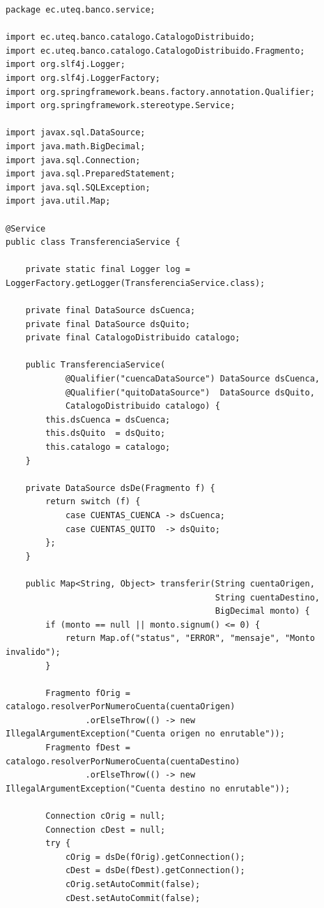 \documentclass[11pt,a4paper]{article}
\begin{document}
\begin{lstlisting}[style=JavaStyle,caption={TransferenciaService.java: simulacion didactica de 2PC en capa de aplicacion}]
package ec.uteq.banco.service;

import ec.uteq.banco.catalogo.CatalogoDistribuido;
import ec.uteq.banco.catalogo.CatalogoDistribuido.Fragmento;
import org.slf4j.Logger;
import org.slf4j.LoggerFactory;
import org.springframework.beans.factory.annotation.Qualifier;
import org.springframework.stereotype.Service;

import javax.sql.DataSource;
import java.math.BigDecimal;
import java.sql.Connection;
import java.sql.PreparedStatement;
import java.sql.SQLException;
import java.util.Map;

@Service
public class TransferenciaService {

    private static final Logger log = LoggerFactory.getLogger(TransferenciaService.class);

    private final DataSource dsCuenca;
    private final DataSource dsQuito;
    private final CatalogoDistribuido catalogo;

    public TransferenciaService(
            @Qualifier("cuencaDataSource") DataSource dsCuenca,
            @Qualifier("quitoDataSource")  DataSource dsQuito,
            CatalogoDistribuido catalogo) {
        this.dsCuenca = dsCuenca;
        this.dsQuito  = dsQuito;
        this.catalogo = catalogo;
    }

    private DataSource dsDe(Fragmento f) {
        return switch (f) {
            case CUENTAS_CUENCA -> dsCuenca;
            case CUENTAS_QUITO  -> dsQuito;
        };
    }

    public Map<String, Object> transferir(String cuentaOrigen,
                                          String cuentaDestino,
                                          BigDecimal monto) {
        if (monto == null || monto.signum() <= 0) {
            return Map.of("status", "ERROR", "mensaje", "Monto invalido");
        }

        Fragmento fOrig = catalogo.resolverPorNumeroCuenta(cuentaOrigen)
                .orElseThrow(() -> new IllegalArgumentException("Cuenta origen no enrutable"));
        Fragmento fDest = catalogo.resolverPorNumeroCuenta(cuentaDestino)
                .orElseThrow(() -> new IllegalArgumentException("Cuenta destino no enrutable"));

        Connection cOrig = null;
        Connection cDest = null;
        try {
            cOrig = dsDe(fOrig).getConnection();
            cDest = dsDe(fDest).getConnection();
            cOrig.setAutoCommit(false);
            cDest.setAutoCommit(false);


\end{lstlisting}
\end{document}
